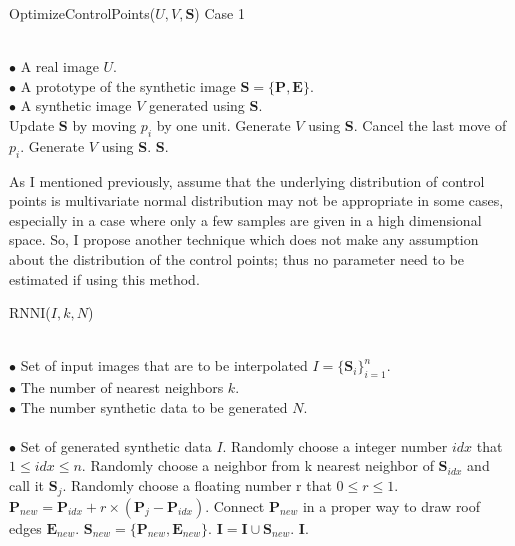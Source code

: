 \documentclass{iitthesis}
\begin{document}
{\linespread{1.5}
\begin{algorithm}[htb]  
\small
     \caption{ OptimizeControlPoints($U, V, \textbf{S}$) Case 1}   
    \label{Alg: OCP1}    
    \begin{algorithmic}[1]          \REQUIRE ~~\\ 
        $\bullet$ A real image $U$. \\ 
        $\bullet$ A prototype of the synthetic image $\textbf{S}=\{\textbf{P}, \textbf{E}\}$.\\     
    $\bullet$ A synthetic image $V$ generated using $\textbf{S}$.  \\     
             \STATE Update $\textbf{S}$ by moving $p_i$ by one unit.     
    \STATE Generate $V$ using \textbf{S}.     
            \STATE Cancel the last move of $p_i$.     
        \STATE Generate $V$ using \textbf{S}.     
    \ENDIF     
    \ENDFOR     
    \RETURN \textbf{S}.     
\end{algorithmic}   
\end{algorithm}  
}

As I mentioned previously, assume that the underlying distribution of control points is multivariate normal distribution may not be appropriate in some cases, especially in a case where only a few samples are given in a high dimensional space. So, I propose another technique which does not make any assumption about the distribution of the control points; thus no parameter need to be estimated if using this method. 

{\linespread{1.5}
\begin{algorithm}[htb]  
\small
     \caption{ RNNI($I, k, N$)}   
    \label{Alg: RNNI}    
    \begin{algorithmic}[1]          
    \REQUIRE ~~\\ 
        $\bullet$ Set of input images that are to be interpolated $I=\{\textbf{S}_i\}_{i=1}^n$. \\ 
        $\bullet$ The number of nearest neighbors $k$. \\     
        $\bullet$ The number synthetic data to be generated $N$. \\
    \ENSURE ~~\\
        $\bullet$ Set of generated synthetic data $I$.     
    \STATE Randomly choose a integer number $idx$ that $1\leq idx \leq n$.     
    \STATE Randomly choose a neighbor from k nearest neighbor of $\textbf{S}_{idx}$ and call it $\textbf{S}_j$.
    \STATE Randomly choose a floating number r that $0\leq r \leq 1$.    
    \STATE $\textbf{P}_{new}=\textbf{P}_{idx}+r\times(\textbf{P}_j-\textbf{P}_{idx})$.
    \STATE Connect $\textbf{P}_{new}$ in a proper way to draw roof edges $\textbf{E}_{new}$.
    \STATE $\textbf{S}_{new}=\{\textbf{P}_{new}, \textbf{E}_{new}\}$.
    \STATE $\textbf{I}=\textbf{I}\cup \textbf{S}_{new}$.
    \ENDFOR     
    \RETURN \textbf{I}.     
\end{algorithmic}   
\end{algorithm}  
}
\end{document}
